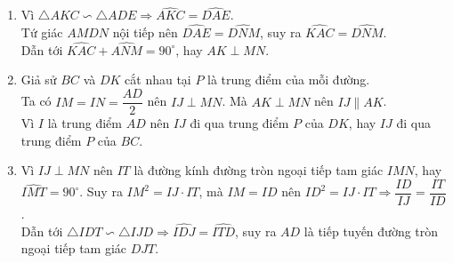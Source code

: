 \begin{ex}
{\begin{enumerate}
			Mặt khác ta có $\triangle ABC\backsim \triangle AFE\Rightarrow \dfrac{BC}{EF}=\dfrac{AC}{AE}$, nên $\dfrac{KC}{DE}=\dfrac{AC}{AE}$.\\
			Mà $\widehat{ACK}=\widehat{ACD}+\widehat{DCK}=\widehat{ABD}+\widehat{EDB}=\widehat{AED}\Rightarrow \triangle AKC\backsim \triangle ADE$ (c.g.c).
			\item Vì $\triangle AKC\backsim \triangle ADE\Rightarrow \widehat{AKC}=\widehat{DAE}$.\\
			Tứ giác $AMDN$ nội tiếp nên $\widehat{DAE}=\widehat{DNM}$, suy ra $\widehat{KAC}=\widehat{DNM}$.\\
			Dẫn tới $\widehat{KAC}+\widehat{ANM}=90^\circ$, hay $AK\perp MN$.
			\item Giả sử $BC$ và $DK$ cắt nhau tại $P$ là trung điểm của mỗi đường.\\
			Ta có $IM=IN=\dfrac{AD}{2}$ nên $IJ\perp MN$. Mà $AK\perp MN$ nên $IJ\parallel AK$.\\
			Vì $I$ là trung điểm $AD$ nên $IJ$ đi qua trung điểm $P$ của $DK$, hay $IJ$ đi qua trung điểm $P$ của $BC$.
			\item Vì $IJ\perp MN$ nên $IT$ là đường kính đường tròn ngoại tiếp tam giác $IMN$, hay $\widehat{IMT}=90^\circ$. Suy ra $IM^2=IJ\cdot IT$, mà $IM=ID$ nên $ID^2=IJ\cdot IT\Rightarrow \dfrac{ID}{IJ}=\dfrac{IT}{ID}$.\\
			Dẫn tới $\triangle IDT\backsim \triangle IJD \Rightarrow \widehat{IDJ}=\widehat{ITD}$, suy ra $AD$ là tiếp tuyến đường tròn ngoại tiếp tam giác $DJT$.
		\end{enumerate}
	}
\end{ex}

